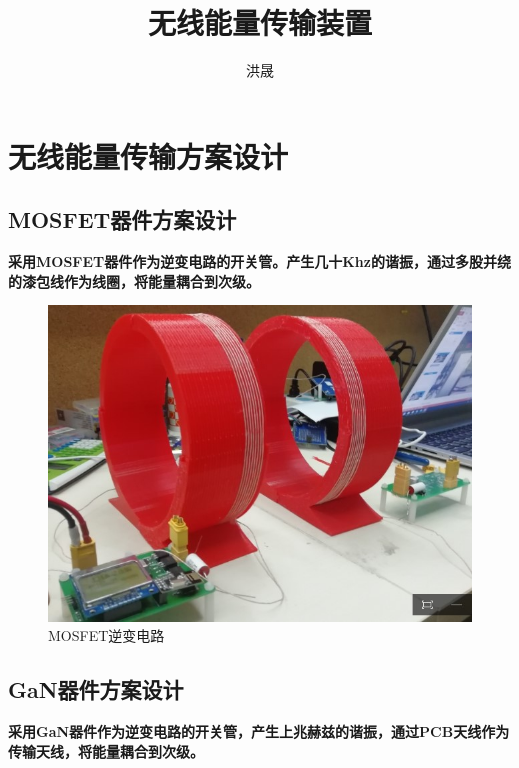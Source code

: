 ﻿\documentclass[UTF-8,12pt]{ctexart}
\title{无线能量传输装置}%
\author{洪晟}%
\begin{document}
\makeatletter
\renewcommand{\tablename}{表}
\renewcommand{\figurename}{图}
\renewcommand{\thefigure}{\thesection.\arabic{figure}\quad}
\renewcommand{\thetable}{\thesection.\arabic{table}\quad}
\makeatother

\maketitle
\pagestyle{fancy}

\section{无线能量传输方案设计}



    \subsection{MOSFET器件方案设计}

        {\bf{采用MOSFET器件作为逆变电路的开关管。产生几十Khz的谐振，通过多股并绕的漆包线作为线圈，将能量耦合到次级。}}
        \begin{figure}[H]
          \centering
          \includegraphics[scale=0.6]{wire1.jpg}
          \caption{MOSFET逆变电路}
          \label{图1 MOSFET逆变电路}
        \end{figure}


    \subsection{GaN器件方案设计}

        {\bf{采用GaN器件作为逆变电路的开关管，产生上兆赫兹的谐振，通过PCB天线作为传输天线，将能量耦合到次级。}}
\end{document}
